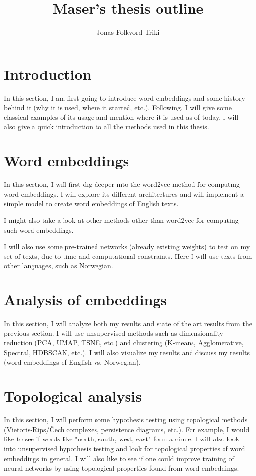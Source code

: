 \documentclass{article}
\title{Maser's thesis outline}
\author{Jonas Folkvord Triki}
\begin{document}
\maketitle

\section{Introduction}
In this section, I am first going to introduce word embeddings and some history behind it (why it is used, where it started, etc.). Following, I will give some classical examples of its usage and mention where it is used as of today. I will also give a quick introduction to all the methods used in this thesis.

\section{Word embeddings}
In this section, I will first dig deeper into the word2vec method for computing word embeddings. I will explore its different architectures and will implement a simple model to create word embeddings of English texts.

I might also take a look at other methods other than word2vec for computing such word embeddings.

I will also use some pre-trained networks (already existing weights) to test on my set of texts, due to time and computational constraints. Here I will use texts from other languages, such as Norwegian.

\section{Analysis of embeddings}
In this section, I will analyze both my results and state of the art results from the previous section. I will use unsupervised methods such as dimensionality reduction (PCA, UMAP, TSNE, etc.) and clustering (K-means, Agglomerative, Spectral, HDBSCAN, etc.). I will also visualize my results and discuss my results (word embeddings of English vs. Norwegian).

\section{Topological analysis}
In this section, I will perform some hypothesis testing using topological methods (Vietoris-Rips/Čech complexes, persistence diagrams, etc.). For example, I would like to see if words like "north, south, west, east" form a circle. I will also look into unsupervised hypothesis testing and look for topological properties of word embeddings in general. I will also like to see if one could improve training of neural networks by using topological properties found from word embeddings.
\end{document}
